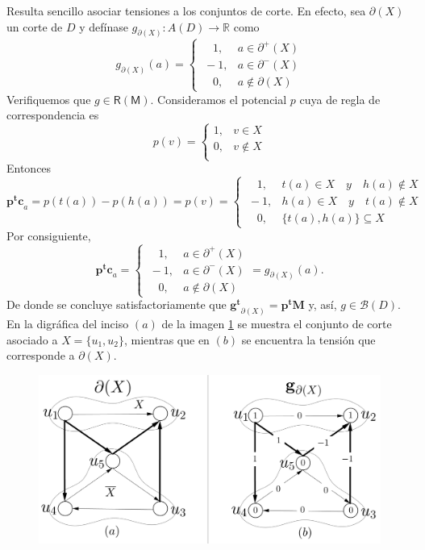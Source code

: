 Resulta sencillo asociar tensiones a los conjuntos de corte. En efecto, sea $\partial(X)$ un corte de $D$ y defínase $g_{\partial(X)}\colon A(D) \rightarrow \mathbb{R}$ como 
$$
g_{\partial(X)}(a) = \left\{\begin{matrix}
\quad1, & a \in \partial^{+}(X)\\ 
\ -1, & a \in \partial^{-}(X)\\
\quad 0, & a \notin \partial(X) 
\end{matrix}\right.
$$
Verifiquemos que $g\in \mathsf{R}(\mathsf{M})$. Consideramos el potencial $p$ cuya de regla de correspondencia es
$$
p(v) = \left\{\begin{matrix}
1, & v \in X\\ 
0, & v \notin X\\
\end{matrix}\right.
$$
Entonces 
$$
\mathbf{p^{t}c}_{a} = p(t(a)) - p(h(a)) = p(v) =
\left\{\begin{matrix}
\quad 1, & t(a) \in X \quad y \quad h(a) \notin X \\ 
\ -1, & h(a) \in X \quad y \quad t(a) \notin X\\
\quad 0, & \{t(a), h(a)\} \subseteq X
\end{matrix}\right.
$$
Por consiguiente,
$$
\mathbf{p^{t}c}_{a} = \left\{\begin{matrix}
\quad1, & a \in \partial^{+}(X)\\ 
\ -1, & a \in \partial^{-}(X)\\
\quad 0, & a \notin \partial(X) 
\end{matrix}\right. = g_{\partial(X)}(a).
$$
De donde se concluye satisfactoriamente que $\mathbf{g^{t}}_{\partial(X)} = \mathbf{p^{t}M}$ y, así, $g \in \mathcal{B}(D)$. En la digráfica del inciso $(a)$ de la imagen \ref{fig:tensionesycortes} se muestra el conjunto de corte asociado a $X=\{u_{1},u_{2}\}$, mientras que en $(b)$ se encuentra la tensión que corresponde a $\partial(X)$.

\begin{figure}[t]
    \centering
    \includegraphics[scale = 0.2]{img/imgchapter2/tensionesycortes.jpg}
    \caption{}
    \label{fig:tensionesycortes}
\end{figure}

